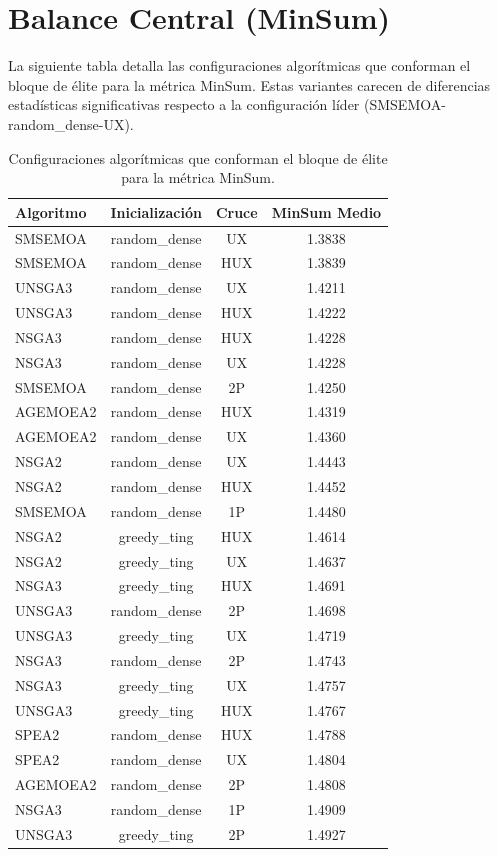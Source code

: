 \section{Balance Central (MinSum)}\label{anexo:elite_minsum}

La siguiente tabla detalla las configuraciones algorítmicas que conforman el bloque de élite para la métrica MinSum. Estas variantes carecen de diferencias estadísticas significativas respecto a la configuración líder (SMSEMOA-random\_dense-UX).

\begin{table}[H]
    \centering
    \begin{tabular}{lccc}
        \toprule
        \textbf{Algoritmo} & \textbf{Inicialización} & \textbf{Cruce} & \textbf{MinSum Medio} \\
        \midrule
        SMSEMOA & random\_dense & UX & 1.3838 \\
        SMSEMOA & random\_dense & HUX & 1.3839 \\
        UNSGA3 & random\_dense & UX & 1.4211 \\
        UNSGA3 & random\_dense & HUX & 1.4222 \\
        NSGA3 & random\_dense & HUX & 1.4228 \\
        NSGA3 & random\_dense & UX & 1.4228 \\
        SMSEMOA & random\_dense & 2P & 1.4250 \\
        AGEMOEA2 & random\_dense & HUX & 1.4319 \\
        AGEMOEA2 & random\_dense & UX & 1.4360 \\
        NSGA2 & random\_dense & UX & 1.4443 \\
        NSGA2 & random\_dense & HUX & 1.4452 \\
        SMSEMOA & random\_dense & 1P & 1.4480 \\
        NSGA2 & greedy\_ting & HUX & 1.4614 \\
        NSGA2 & greedy\_ting & UX & 1.4637 \\
        NSGA3 & greedy\_ting & HUX & 1.4691 \\
        UNSGA3 & random\_dense & 2P & 1.4698 \\
        UNSGA3 & greedy\_ting & UX & 1.4719 \\
        NSGA3 & random\_dense & 2P & 1.4743 \\
        NSGA3 & greedy\_ting & UX & 1.4757 \\
        UNSGA3 & greedy\_ting & HUX & 1.4767 \\
        SPEA2 & random\_dense & HUX & 1.4788 \\
        SPEA2 & random\_dense & UX & 1.4804 \\
        AGEMOEA2 & random\_dense & 2P & 1.4808 \\
        NSGA3 & random\_dense & 1P & 1.4909 \\
        UNSGA3 & greedy\_ting & 2P & 1.4927 \\
        \bottomrule
    \end{tabular}
    \caption[Bloque de élite de MinSum]{Configuraciones algorítmicas que conforman el bloque de élite para la métrica MinSum.}
    \label{tab:elite_minsum}
\end{table}

